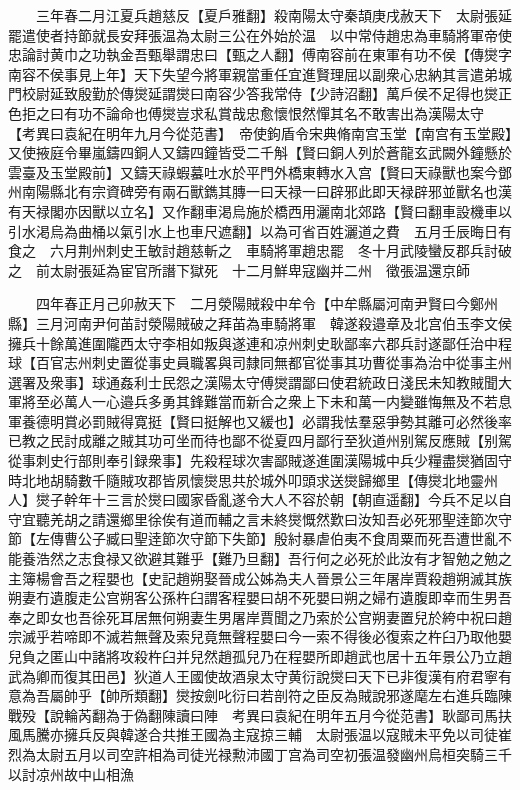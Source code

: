 　　三年春二月江夏兵趙慈反【夏戶雅翻】殺南陽太守秦頡庚戌赦天下　太尉張延罷遣使者持節就長安拜張温為太尉三公在外始於温　以中常侍趙忠為車騎將軍帝使忠論討黄巾之功執金吾甄舉謂忠曰【甄之人翻】傅南容前在東軍有功不侯【傳爕字南容不侯事見上年】天下失望今將軍親當重任宜進賢理屈以副衆心忠納其言遣弟城門校尉延致殷勤於傳爕延謂爕曰南容少答我常侍【少詩沼翻】萬戶侯不足得也爕正色拒之曰有功不論命也傅爕豈求私賞哉忠愈懷恨然憚其名不敢害出為漢陽太守　【考異曰袁紀在明年九月今從范書】　帝使鉤盾令宋典脩南宫玉堂【南宫有玉堂殿】又使掖庭令畢嵐鑄四銅人又鑄四鐘皆受二千斛【賢曰銅人列於蒼龍玄武闕外鐘懸於雲臺及玉堂殿前】又鑄天祿蝦蟇吐水於平門外橋東轉水入宫【賢曰天祿獸也案今鄧州南陽縣北有宗資碑旁有兩石獸鐫其膞一曰天禄一曰辟邪此即天禄辟邪並獸名也漢有天禄閣亦因獸以立名】又作翻車渇烏施於橋西用灑南北郊路【賢曰翻車設機車以引水渇烏為曲桶以氣引水上也車尺遮翻】以為可省百姓灑道之費　五月壬辰晦日有食之　六月荆州刺史王敏討趙慈斬之　車騎將軍趙忠罷　冬十月武陵蠻反郡兵討破之　前太尉張延為宦官所譖下獄死　十二月鮮卑寇幽并二州　徵張温還京師

　　四年春正月己卯赦天下　二月滎陽賊殺中牟令【中牟縣屬河南尹賢曰今鄭州縣】三月河南尹何苖討滎陽賊破之拜苖為車騎將軍　韓遂殺邉章及北宫伯玉李文侯擁兵十餘萬進圍隴西太守李相如叛與遂連和凉州刺史耿鄙率六郡兵討遂鄙任治中程球【百官志州刺史置從事史員職畧與司隸同無都官從事其功曹從事為治中從事主州選署及衆事】球通姦利士民怨之漢陽太守傅爕謂鄙曰使君統政日淺民未知教賊聞大軍將至必萬人一心邉兵多勇其鋒難當而新合之衆上下未和萬一内變雖悔無及不若息軍養德明賞必罰賊得寛挺【賢曰挺解也又緩也】必謂我怯羣惡爭勢其離可必然後率已教之民討成離之賊其功可坐而待也鄙不從夏四月鄙行至狄道州别駕反應賊【别駕從事刺史行部則奉引録衆事】先殺程球次害鄙賊遂進圍漢陽城中兵少糧盡爕猶固守時北地胡騎數千隨賊攻郡皆夙懷爕思共於城外叩頭求送爕歸鄉里【傳爕北地靈州人】爕子幹年十三言於爕曰國家昏亂遂令大人不容於朝【朝直遥翻】今兵不足以自守宜聽羌胡之請還鄉里徐俟有道而輔之言未終爕慨然歎曰汝知吾必死邪聖逹節次守節【左傳曹公子臧曰聖逹節次守節下失節】殷紂暴虐伯夷不食周粟而死吾遭世亂不能養浩然之志食禄又欲避其難乎【難乃旦翻】吾行何之必死於此汝有才智勉之勉之主簿楊會吾之程嬰也【史記趙朔娶晉成公姊為夫人晉景公三年屠岸賈殺趙朔滅其族朔妻冇遺腹走公宫朔客公孫杵臼謂客程嬰曰胡不死嬰曰朔之婦冇遺腹即幸而生男吾奉之即女也吾徐死耳居無何朔妻生男屠岸賈聞之乃索於公宫朔妻置兒於絝中祝曰趙宗滅乎若啼即不滅若無聲及索兒竟無聲程嬰曰今一索不得後必復索之杵臼乃取他嬰兒負之匿山中諸將攻殺杵臼并兒然趙孤兒乃在程嬰所即趙武也居十五年景公乃立趙武為卿而復其田邑】狄道人王國使故酒泉太守黄衍說爕曰天下已非復漢有府君寧有意為吾屬帥乎【帥所類翻】爕按劍叱衍曰若剖符之臣反為賊說邪遂麾左右進兵臨陳戰殁【說輪芮翻為于偽翻陳讀曰陣　考異曰袁紀在明年五月今從范書】耿鄙司馬扶風馬騰亦擁兵反與韓遂合共推王國為主寇掠三輔　太尉張温以寇賊未平免以司徒崔烈為太尉五月以司空許相為司徒光禄勲沛國丁宫為司空初張温發幽州烏桓突騎三千以討凉州故中山相漁

